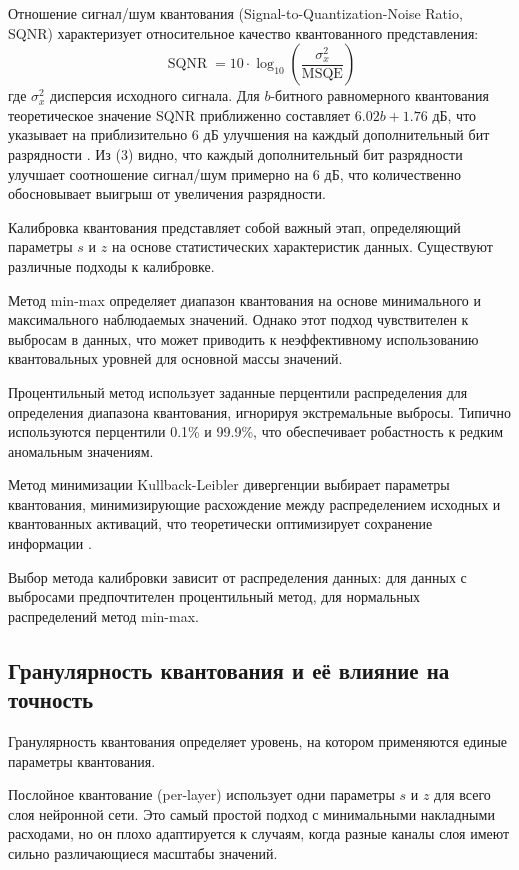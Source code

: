 \documentclass[bachelor, och, coursework]{SCWorks}
\begin{document}
	Отношение сигнал/шум квантования (Signal-to-Quantization-Noise Ratio, SQNR) характеризует относительное качество квантованного представления:
	\[
	\operatorname{SQNR} = 10 \cdot \log_{10}\left(\frac{\sigma_{x}^{2}}{\operatorname{MSQE}}\right) \tag{3}
	\]
	где \(\sigma_{x}^{2}\) дисперсия исходного сигнала. Для \(b\)-битного равномерного квантования теоретическое значение SQNR приближенно составляет \(6.02b + 1.76\) дБ, что указывает на приблизительно 6 дБ улучшения на каждый дополнительный бит разрядности \cite{nf4}. Из (3) видно, что каждый дополнительный бит разрядности улучшает соотношение сигнал/шум примерно на 6 дБ, что количественно обосновывает выигрыш от увеличения разрядности.
	
	Калибровка квантования представляет собой важный этап, определяющий параметры \(s\) и \(z\) на основе статистических характеристик данных. Существуют различные подходы к калибровке.
	
	Метод min-max определяет диапазон квантования на основе минимального и максимального наблюдаемых значений. Однако этот подход чувствителен к выбросам в данных, что может приводить к неэффективному использованию квантовальных уровней для основной массы значений.
	
	Процентильный метод использует заданные перцентили распределения для определения диапазона квантования, игнорируя экстремальные выбросы. Типично используются перцентили 0.1\% и 99.9\%, что обеспечивает робастность к редким аномальным значениям.
	
	Метод минимизации Kullback-Leibler дивергенции выбирает параметры квантования, минимизирующие расхождение между распределением исходных и квантованных активаций, что теоретически оптимизирует сохранение информации \cite{smoothquant}.
	
	Выбор метода калибровки зависит от распределения данных: для данных с выбросами предпочтителен процентильный метод, для нормальных распределений метод min-max.
	
	\subsection{Гранулярность квантования и её влияние на точность}
	
	Гранулярность квантования определяет уровень, на котором применяются единые параметры квантования.
	
	Послойное квантование (per-layer) использует одни параметры \(s\) и \(z\) для всего слоя нейронной сети. Это самый простой подход с минимальными накладными расходами, но он плохо адаптируется к случаям, когда разные каналы слоя имеют сильно различающиеся масштабы значений.
	
\end{document}
